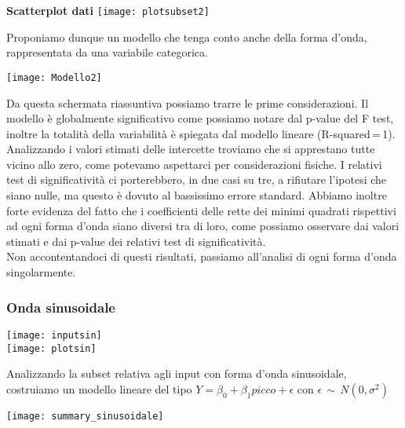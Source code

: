 \documentclass[a4paper]{article}
\begin{document}
	\begin{center}
        \footnotesize{\textbf{Scatterplot dati}}
		\texttt{[image: plotsubset2]} 
		
	\end{center}
	
	Proponiamo dunque un modello che tenga conto anche della forma d'onda, rappresentata da una variabile categorica.
	
	\begin{center}
		
		\texttt{[image: Modello2]} 
		
	\end{center}

	Da questa schermata riassuntiva possiamo trarre le prime considerazioni. Il modello è globalmente significativo come possiamo notare dal p-value del F test, inoltre la totalità della variabilità è spiegata dal modello lineare (R-squared\,=\,1). Analizzando i valori stimati delle intercette troviamo che si apprestano tutte vicino allo zero, come potevamo aspettarci per considerazioni fisiche. I relativi test di significatività ci porterebbero, in due casi su tre, a rifiutare l’ipotesi che siano nulle, ma questo è dovuto al bassissimo errore standard. Abbiamo inoltre forte evidenza del fatto che i coefficienti delle rette dei minimi quadrati rispettivi ad ogni forma d’onda siano diversi tra di loro, come possiamo osservare dai valori stimati e dai p-value dei relativi test di significatività.
	\newline \\
	Non accontentandoci di questi risultati, passiamo all’analisi di ogni forma d’onda singolarmente.
	\newpage
	\subsubsection{Onda sinusoidale}
	\bigskip 
	\bigskip 
	\begin{center}
		
		\texttt{[image: inputsin]} 
		\bigskip \\
		\texttt{[image: plotsin]}
	\end{center}
	Analizzando la subset relativa agli input con forma d’onda sinusoidale, costruiamo un modello lineare del tipo $Y=\beta_0 + \beta_1 picco + \epsilon$ con $\epsilon\, \mathtt{\sim}\, N(0, \sigma^2)$
	
	\begin{center}
		
		\texttt{[image: summary\_sinusoidale]} 
		
	\end{center}
\end{document}
